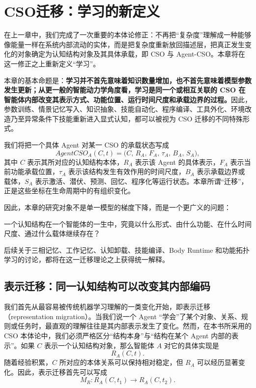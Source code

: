 \chapter{CSO迁移：学习的新定义}
\label{chap:cso-migration}

\begin{chapterlead}
在上一章中，我们完成了一次重要的本体论修正：不再把“复杂度”理解成一种能够像能量一样在系统内部流动的实体，而是把复杂度重新放回描述层，把真正发生变化的对象确定为认知结构对象及其具体承载，即 CSO 与 Agent-CSO。本章将在这一修正之上重新定义“学习”。

本章的基本命题是：\textbf{学习并不首先意味着知识数量增加，也不首先意味着模型参数发生更新；从更一般的智能动力学角度看，学习是同一个或相互关联的 CSO 在智能体内部改变其表示方式、功能位置、运行时间尺度和承载边界的过程。}因此，参数训练、情景记忆写入、知识抽象、技能自动化、程序编译、工具外化、环境改造乃至异常条件下技能重新进入显式认知，都可以被视为 CSO 迁移的不同特殊形式。

我们将把一个具体 Agent 对某一 CSO 的承载状态写成
\[
AgentCSO_A(C,t)
=
\bigl(
C,\,
R_A,\,
F_A,\,
\tau_A,\,
B_A,\,
S_A
\bigr),
\]
其中 $C$ 表示其所对应的认知结构本体，$R_A$ 表示该 Agent 的具体表示，$F_A$ 表示当前功能承载位置，$\tau_A$ 表示该结构发生有效作用的时间尺度，$B_A$ 表示承载边界或载体，$S_A$ 表示激活、潜伏、预测、回忆、程序化等运行状态。本章所谓“迁移”，正是这些坐标在生命周期中的有组织变化。

因此，本章的研究对象不是单一模型的梯度下降，而是一个更广义的问题：

\begin{statementbox}
一个认知结构在一个智能体的一生中，究竟以什么形式、由什么功能、在什么时间尺度、通过什么载体继续存在？
\end{statementbox}

后续关于三相记忆、工作记忆、认知卸载、技能编译、Body Runtime 和功能拓扑学习的讨论，都将在这一迁移理论之上获得统一解释。
\end{chapterlead}


\section{表示迁移：同一认知结构可以改变其内部编码}

我们首先从最容易被传统机器学习理解的一类变化开始，即表示迁移（representation migration）。当我们说一个 Agent “学会”了某个对象、关系、规则或任务时，最直观的理解往往是其内部表示发生了变化。然而，在本书所采用的 CSO 本体论中，我们必须严格区分“结构本身”与“结构在某个 Agent 内部的表示”。如果 $C$ 表示一个认知结构对象，那么智能体 $A$ 对它的具体实现是
\[
R_A(C,t).
\]
随着经验积累，$C$ 所对应的本体关系可以保持相对稳定，但 $R_A$ 可以经历显著变化。因此，表示迁移首先可以写成
\[
M_R:
R_A(C,t_1)
\longrightarrow
R_A(C,t_2).
\]

